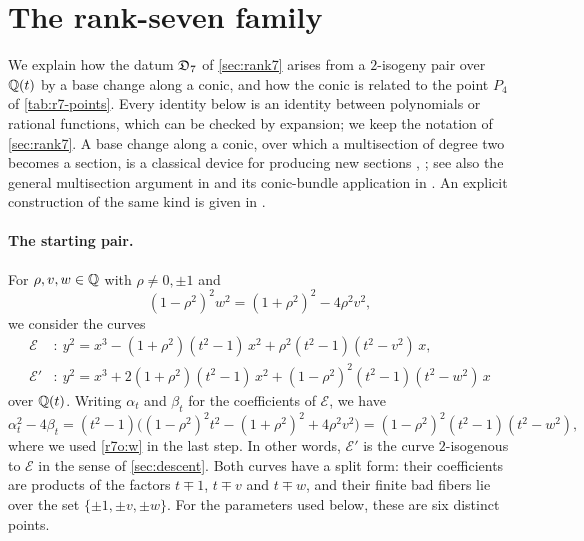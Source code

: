 \section{The rank-seven family}\label{sec:origin-r7}

We explain how the datum $\mathfrak D_7$ of \cref{sec:rank7}
arises from a $2$-isogeny pair over $\mathbb Q(t)$ by a base change along a conic,
and how the conic is related to the point $P_4$ of \cref{tab:r7-points}.
Every identity below is an identity between polynomials
or rational functions, which can be checked by expansion; we keep the
notation of \cref{sec:rank7}. A base change along a conic, over which a
multisection of degree two becomes a section, is a classical device for
producing new sections \cite[\S2.2]{Mestre1991}, \cite[Lecture~III, p.~2003]{Elkies2007}; see also the general multisection argument in \cite[Corollary~4.3]{Salgado2012} and its conic-bundle application in \cite[\S1.2 and Theorem~2.4]{LoughranSalgado2022}. An explicit construction of the
same kind is given in \cite[\S4]{DujellaPeral2024}.

\paragraph{The starting pair.} For $\rho,v,w\in\mathbb Q$ with $\rho\ne0,\pm1$ and
\begin{equation}\label{r7o:w}
 (1-\rho^2)^2w^2=(1+\rho^2)^2-4\rho^2v^2,
\end{equation}
we consider the curves
\begin{equation}\label{r7o:template}
\begin{aligned}
 \mathcal E&:\ y^2=x^3-(1+\rho^2)(t^2-1)\,x^2+\rho^2(t^2-1)(t^2-v^2)\,x,\\
 \mathcal E'&:\ y^2=x^3+2(1+\rho^2)(t^2-1)\,x^2+(1-\rho^2)^2(t^2-1)(t^2-w^2)\,x
\end{aligned}
\end{equation}
over $\mathbb Q(t)$. Writing $\alpha_t$ and $\beta_t$ for the coefficients of
$\mathcal E$, we have
\[
 \alpha_t^2-4\beta_t=(t^2-1)\bigl((1-\rho^2)^2t^2-(1+\rho^2)^2+4\rho^2v^2\bigr)
 =(1-\rho^2)^2(t^2-1)(t^2-w^2),
\]
where we used \eqref{r7o:w} in the last step. In other words, $\mathcal E'$ is the
curve $2$-isogenous to $\mathcal E$ in the sense of \cref{sec:descent}. Both
curves have a split form: their coefficients are products of the factors
$t\mp1$, $t\mp v$ and $t\mp w$, and their finite bad fibers lie over
the set $\{\pm1,\pm v,\pm w\}$. For the parameters used below, these are six
distinct points.

